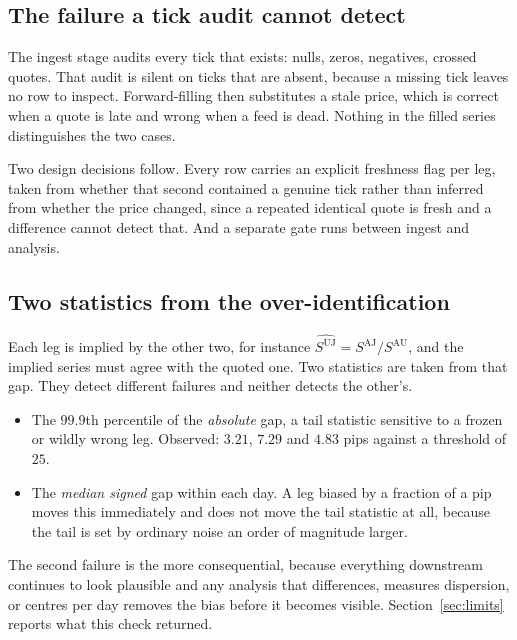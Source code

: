 \documentclass[11pt,a4paper]{article}
\newcommand{\AU}{\mathrm{AU}}
\newcommand{\UJ}{\mathrm{UJ}}
\newcommand{\AJ}{\mathrm{AJ}}
\begin{document}
\subsection{The failure a tick audit cannot detect}

The ingest stage audits every tick that exists: nulls, zeros, negatives, crossed quotes.
That audit is silent on ticks that are absent, because a missing tick leaves no row to
inspect. Forward-filling then substitutes a stale price, which is correct when a quote is
late and wrong when a feed is dead. Nothing in the filled series distinguishes the two
cases.

Two design decisions follow. Every row carries an explicit freshness flag per leg, taken
from whether that second contained a genuine tick rather than inferred from whether the
price changed, since a repeated identical quote is fresh and a difference cannot detect
that. And a separate gate runs between ingest and analysis.

\subsection{Two statistics from the over-identification}

Each leg is implied by the other two, for instance $\widehat{S^{\UJ}} = S^{\AJ}/S^{\AU}$,
and the implied series must agree with the quoted one. Two statistics are taken from that
gap. They detect different failures and neither detects the other's.

\begin{itemize}[leftmargin=1.6em,itemsep=5pt]
  \item The $99.9$th percentile of the \emph{absolute} gap, a tail statistic sensitive to a
  frozen or wildly wrong leg. Observed: $3.21$, $7.29$ and $4.83$ pips against a threshold
  of $25$.

  \item The \emph{median signed} gap within each day. A leg biased by a fraction of a pip
  moves this immediately and does not move the tail statistic at all, because the tail is
  set by ordinary noise an order of magnitude larger.
\end{itemize}

The second failure is the more consequential, because everything downstream continues to
look plausible and any analysis that differences, measures dispersion, or centres per day
removes the bias before it becomes visible. Section~\ref{sec:limits} reports what this check
returned.
\end{document}
